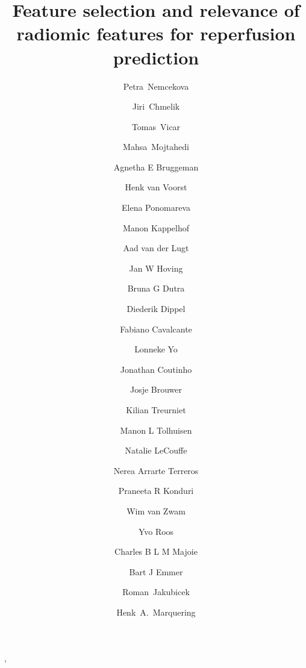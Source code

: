 \documentclass[preprint,12pt]{elsarticle}
\begin{document}
\begin{frontmatter}




\title{Feature selection and relevance of radiomic features for reperfusion prediction}



\author[FEEC]{Petra~Nemcekova}
\author[FEEC]{Jiri~Chmelik}
\author[FEEC]{Tomas~Vicar}
\author[UMC]{Mahsa~Mojtahedi}
\author[DRUMC]{Agnetha E Bruggeman},
\author[UMC]{Henk van Voorst}
\author[NICOLAB]{Elena Ponomareva}
\author[DRUMC]{Manon Kappelhof}
\author[DRNM]{Aad van der Lugt}
\author[DRUMC]{Jan W Hoving}
\author[DRUMC]{Bruna G Dutra}
\author[DN]{Diederik Dippel}
\author[DRUMC]{Fabiano Cavalcante}
\author[DRCZ]{Lonneke Yo}
\author[DNUMC]{Jonathan Coutinho}
\author[DNUMC]{Josje Brouwer}
\author[RBRNM, DRH]{Kilian Treurniet}
\author[UMC]{Manon L Tolhuisen}
\author[DNUMC]{Natalie LeCouffe}
\author[UMC, DRUMC]{Nerea Arrarte Terreros}
\author[UMC, DRUMC]{Praneeta R Konduri}
\author[DRNMM]{Wim van Zwam}
\author[DNUMC]{Yvo Roos}
\author[DRUMC]{Charles B L M Majoie}
\author[DRUMC]{Bart J Emmer}
\author[FEEC]{Roman~Jakubicek}
\author[UMC]{Henk~A.~Marquering}



\end{frontmatter}
\end{document}
